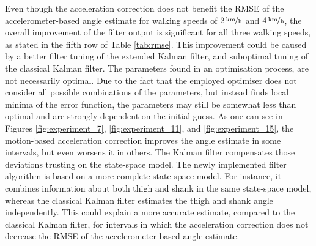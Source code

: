  Even though the acceleration correction does not benefit the RMSE of the accelerometer-based angle estimate for walking speeds of $\unitfrac[2]{km}{h}$ and $\unitfrac[4]{km}{h}$, the overall improvement of the filter output is significant for all three walking speeds, as stated in the fifth row of Table \ref{tab:rmse}. This improvement could be caused by a better filter tuning of the extended Kalman filter, and suboptimal tuning of the classical Kalman filter. The parameters found in an optimisation process, are not necessarily optimal. Due to the fact that the employed optimiser does not consider all possible combinations of the parameters, but instead finds local minima of the error function, the parameters may still be somewhat less than optimal and are strongly dependent on the initial guess. As one can see in Figures \ref{fig:experiment_7}, \ref{fig:experiment_11}, and \ref{fig:experiment_15}, the motion-based acceleration correction improves the angle estimate in some intervals, but even worsens it in others. The Kalman filter compensates those deviations trusting on the state-space model. The newly implemented filter algorithm is based on a more complete state-space model. For instance, it combines information about both thigh and shank in the same state-space model, whereas the classical Kalman filter estimates the thigh and shank angle independently. This could explain a more accurate estimate, compared to the classical Kalman filter, for intervals in which the acceleration correction does not decrease the RMSE of the accelerometer-based angle estimate.


